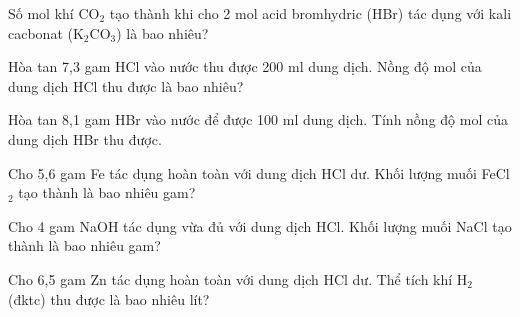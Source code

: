 \documentclass[Main.tex]{subfiles}
\begin{document}
    
    \begin{bt}
    Số mol khí CO$_2$ tạo thành khi cho 2 mol acid bromhydric (HBr) tác dụng với kali cacbonat (K$_2$CO$_3$) là bao nhiêu?
    \end{bt}
    
    \begin{bt}
    Hòa tan 7{,}3 gam HCl vào nước thu được 200 ml dung dịch. Nồng độ mol của dung dịch HCl thu được là bao nhiêu?
    \end{bt}
    
    \begin{bt}
    Hòa tan 8{,}1 gam HBr vào nước để được 100 ml dung dịch. Tính nồng độ mol của dung dịch HBr thu được.
    \end{bt}
    
    \begin{bt}
    Cho 5{,}6 gam Fe tác dụng hoàn toàn với dung dịch HCl dư. Khối lượng muối FeCl$_2$ tạo thành là bao nhiêu gam?
    \end{bt}
    
    \begin{bt}
    Cho 4 gam NaOH tác dụng vừa đủ với dung dịch HCl. Khối lượng muối NaCl tạo thành là bao nhiêu gam?
    \end{bt}
    
    \begin{bt}
    Cho 6{,}5 gam Zn tác dụng hoàn toàn với dung dịch HCl dư. Thể tích khí H$_2$ (đktc) thu được là bao nhiêu lít?
    \end{bt}
    
\end{document}
